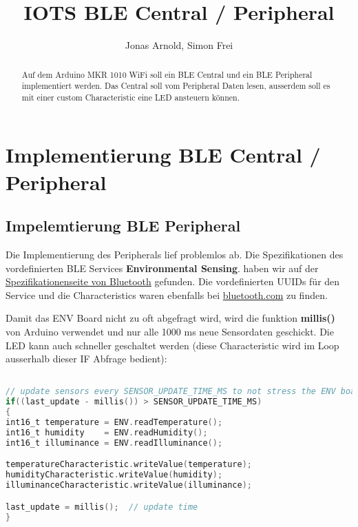 \documentclass{article}
\title{IOTS BLE Central / Peripheral}
\author{Jonas Arnold, Simon Frei}
\begin{document}
\maketitle

\begin{abstract}
Auf dem Arduino MKR 1010 WiFi soll ein BLE Central und ein BLE Peripheral implementiert werden. Das Central soll vom Peripheral Daten lesen, ausserdem soll es mit einer custom Characteristic eine LED ansteuern können. 
\end{abstract}

\section{Implementierung BLE Central / Peripheral}

\subsection{Impelemtierung BLE Peripheral }

Die Implementierung des Peripherals lief problemlos ab. Die Spezifikationen des vordefinierten BLE Services \textbf{Environmental Sensing}. haben wir auf der \href{https://www.bluetooth.com/specifications/specs/}{Spezifikationenseite von Bluetooth} gefunden. Die vordefinierten UUIDs für den Service und die Characteristics waren ebenfalls bei \href{ bluetooth.com/specifications/assigned-numbers }{bluetooth.com} zu finden. 

Damit das ENV Board nicht zu oft abgefragt wird, wird die funktion \textbf{millis()} von Arduino verwendet und nur alle 1000 ms neue Sensordaten geschickt. Die LED kann auch schneller geschaltet werden (diese Characteristic wird im Loop ausserhalb dieser IF Abfrage bedient):
\begin{lstlisting}[style=CStyle, language=C, caption=Limitierung der Sensordatenabfragen]  % Start your code-block

// update sensors every SENSOR_UPDATE_TIME_MS to not stress the ENV board
if((last_update - millis()) > SENSOR_UPDATE_TIME_MS)
{
int16_t temperature = ENV.readTemperature();
int16_t humidity    = ENV.readHumidity();
int16_t illuminance = ENV.readIlluminance();

temperatureCharacteristic.writeValue(temperature);
humidityCharacteristic.writeValue(humidity);
illuminanceCharacteristic.writeValue(illuminance);

last_update = millis();  // update time
}

\end{lstlisting}
\end{document}

